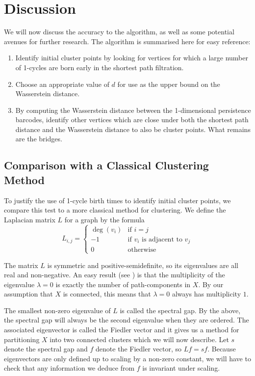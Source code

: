 \documentclass[12pt,a4paper]{amsart}
\numberwithin{equation}{section}
\def\l{\lambda}
\theoremstyle{plain}
\theoremstyle{definition}
\begin{document}
\section{Discussion}

We will now discuss the accuracy to the algorithm, as well as some potential avenues for further research. The algorithm is summarised here for easy reference:
\begin{enumerate}
	\item Identify initial cluster points by looking for vertices for which a large number of 1-cycles are born early in the shortest path filtration.
	\item Choose an appropriate value of $d$ for use as the upper bound on the Wasserstein distance.
	\item By computing the Wasserstein distance between the 1-dimensional persistence barcodes, identify other vertices which are close under both the shortest path distance and the Wasserstein distance to also be cluster points. What remains are the bridges.
\end{enumerate}

\newpage

\subsection{Comparison with a Classical Clustering Method} To justify the use of 1-cycle birth times to identify initial cluster points, we compare this test to a more classical method for clustering. We define the Laplacian matrix $L$ for a graph by the formula
\[ L_{i,j} = \begin{cases} \deg(v_i) & \mbox{if $i=j$} \\ -1 & \mbox{if $v_i$ is adjacent to $v_j$} \\ 0 & \mbox{otherwise} \end{cases} \]

The matrix $L$ is symmetric and positive-semidefinite, so its eigenvalues are all real and non-negative. An easy result (see \cite{fiedler}) is that the multiplicity of the eigenvalue $\l = 0$ is exactly the number of path-components in $X$. By our assumption that $X$ is connected, this means that $\l = 0$ always has multiplicity $1$.

The smallest non-zero eigenvalue of $L$ is called the spectral gap. By the above, the spectral gap will always be the second eigenvalue when they are ordered. The associated eigenvector is called the Fiedler vector and it gives us a method for partitioning $X$ into two connected clusters which we will now describe. Let $s$ denote the spectral gap and $f$ denote the Fiedler vector, so $Lf = sf$. Because eigenvectors are only defined up to scaling by a non-zero constant, we will have to check that any information we deduce from $f$ is invariant under scaling. 
\end{document}
